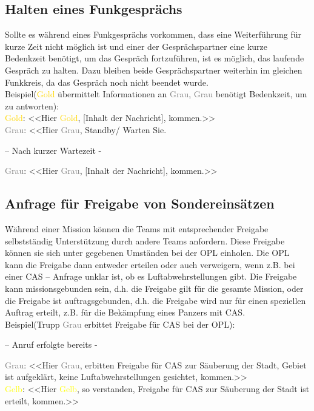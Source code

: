 \subsection{Halten eines Funkgesprächs}
	Sollte es während eines Funkgesprächs vorkommen, dass eine Weiterführung für kurze Zeit nicht möglich ist und einer der Gesprächspartner eine kurze Bedenkzeit benötigt, um das Gespräch fortzuführen, ist es möglich, das laufende Gespräch zu halten. Dazu bleiben beide Gesprächspartner weiterhin im gleichen Funkkreis, da das Gespräch noch nicht beendet wurde. \\
	Beispiel(\textcolor{gold}{Gold} übermittelt Informationen an \textcolor{gray}{Grau}, \textcolor{gray}{Grau} benötigt Bedenkzeit, um zu antworten): \\
	\textcolor{gold}{Gold}: <<Hier \textcolor{gold}{Gold}, [Inhalt der Nachricht], kommen.>> \\
	\textcolor{gray}{Grau}: <<Hier \textcolor{gray}{Grau}, Standby/ Warten Sie. \\
		\begin{center}
		– Nach kurzer Wartezeit - \\
		\end{center}
	\textcolor{gray}{Grau}: <<Hier \textcolor{gray}{Grau}, [Inhalt der Nachricht], kommen.>> \\

\subsection{Anfrage für Freigabe von Sondereinsätzen}
	Während einer Mission können die Teams mit entsprechender Freigabe selbstständig Unterstützung durch andere Teams anfordern. Diese Freigabe können sie sich unter gegebenen Umständen bei der \ac{OPL} einholen. Die \ac{OPL} kann die Freigabe dann entweder erteilen oder auch verweigern, wenn z.B. bei einer \ac{CAS} – Anfrage unklar ist, ob es Luftabwehrstellungen gibt. Die Freigabe kann missionsgebunden sein, d.h. die Freigabe gilt für die gesamte Mission, oder die Freigabe ist auftragsgebunden, d.h. die Freigabe wird nur für einen speziellen Auftrag erteilt, z.B. für die Bekämpfung eines Panzers mit \ac{CAS}. \\
	Beispiel(Trupp \textcolor{gray}{Grau} erbittet Freigabe für \ac{CAS} bei der \ac{OPL}): \\
		\begin{center}
		– Anruf erfolgte bereits -
		\end{center}
	\textcolor{gray}{Grau}: <<Hier \textcolor{gray}{Grau}, erbitten Freigabe für \ac{CAS} zur Säuberung der Stadt, Gebiet ist aufgeklärt, keine Luftabwehrstellungen gesichtet, kommen.>> \\
	\textcolor{yellow}{Gelb}: <<Hier \textcolor{yellow}{Gelb}, so verstanden, Freigabe für \ac{CAS} zur Säuberung der Stadt ist erteilt, kommen.>>\\

